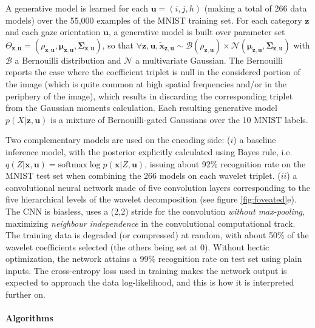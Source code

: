 \documentclass{article}
\begin{document}
A generative model is learned for each $\boldsymbol{u} = (i,j,h)$ (making a total of 266 data models) over the 55,000 examples of the MNIST training set. For each category $\boldsymbol{z}$ and each gaze orientation $\boldsymbol{u}$, a generative model is built over parameter set $\Theta_{\boldsymbol{z},\boldsymbol{u}} = (\rho_{\boldsymbol{z},\boldsymbol{u}}, \boldsymbol{\mu}_{\boldsymbol{z},\boldsymbol{u}}, \boldsymbol{\Sigma}_{\boldsymbol{z},\boldsymbol{u}})$, so that $\forall \boldsymbol{z},\boldsymbol{u}, \tilde{\boldsymbol{x}}_{\boldsymbol{z},\boldsymbol{u}} \sim \mathcal{B}(\rho_{\boldsymbol{z},\boldsymbol{u}}) \times \mathcal{N}(\boldsymbol{\mu}_{\boldsymbol{z},\boldsymbol{u}}, \boldsymbol{\Sigma}_{\boldsymbol{z},\boldsymbol{u}})$ with $\mathcal{B}$ a Bernouilli distribution and $\mathcal{N}$ a multivariate Gaussian. The Bernouilli reports the case where the coefficient triplet is null in the considered portion of the image (which is quite common at high spatial frequencies and/or in the periphery of the image), which results in discarding the corresponding triplet from the Gaussian moments calculation. Each resulting generative model $p(X|\boldsymbol{z},\boldsymbol{u})$ is a mixture of Bernouilli-gated Gaussians over the 10 MNIST labels. 

Two complementary models are used on the encoding side:
($i$) a baseline inference model, with the posterior explicitly calculated using Bayes rule, i.e. $q(Z|\boldsymbol{x},\boldsymbol{u}) = \text{softmax} \log p(\boldsymbol{x}|Z,\boldsymbol{u})$, issuing about 92\% recognition rate on the MNIST test set when combining the 266 models on each wavelet triplet.
($ii$) a convolutional neural network made of five convolution layers corresponding to the five hierarchical levels of the wavelet decomposition (see figure \ref{fig:foveated}e). The CNN is biasless, uses a (2,2) stride for the convolution \emph{without max-pooling}, maximizing \emph{neighbour independence} in the convolutional computational track. The training data is degraded (or compressed) at random, with about 50\% of the wavelet coefficients selected (the others being set at 0).  Without hectic optimization, the network attains a 99\% recognition rate on test set using plain inputs. The cross-entropy loss used in training makes the network output is expected to approach the data log-likelihood, and this is how it is interpreted further on.

\paragraph{Algorithms}
\end{document}

